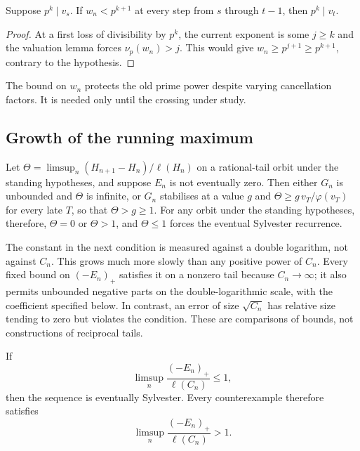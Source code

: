 \begin{corollary}\label{long243:res:powerpersistence}
Suppose $p^k\mid v_s$. If $w_n<p^{k+1}$ at every step from $s$ through
$t-1$, then $p^k\mid v_t$.
\end{corollary}
\begin{proof}
At a first loss of divisibility by $p^k$, the current exponent is some
$j\ge k$ and the valuation lemma forces $\nu_p(w_n)>j$. This would give
$w_n\ge p^{j+1}\ge p^{k+1}$, contrary to the hypothesis.
\end{proof}
The bound on $w_n$ protects the old prime power despite varying
cancellation factors. It is needed only until the crossing under study.

\subsection{Growth of the running maximum}

\begin{theorem}\label{long243:res:recorddichotomy}
Let $\Theta=\limsup_n(H_{n+1}-H_n)/\ell(H_n)$ on a rational-tail orbit
under the standing hypotheses, and suppose $E_n$ is not eventually zero.
Then either $G_n$ is unbounded and $\Theta$ is infinite, or
$G_n$ stabilises at a value $g$ and $\Theta\ge g\,v_T/\varphi(v_T)$ for every
late $T$, so that $\Theta>g\ge1$.  For any orbit under the standing
hypotheses, therefore, $\Theta=0$ or $\Theta>1$, and $\Theta\le1$ forces
the eventual Sylvester recurrence.
\end{theorem}

The constant in the next condition is measured against a double
logarithm, not against $C_n$. This grows much more slowly than any
positive power of $C_n$. Every fixed bound on $(-E_n)_+$ satisfies
it on a nonzero tail because $C_n\to\infty$; it also permits unbounded
negative parts on the double-logarithmic scale, with the coefficient
specified below. In contrast, an error of size
$\sqrt{C_n}$ has relative size tending to zero but violates the condition.
These are comparisons of bounds, not constructions of reciprocal tails.

\begin{corollary}\label{long243:res:loglogboundary}
If
\[
 \limsup_n\frac{(-E_n)_+}{\ell(C_n)}\le1,
\]
then the sequence is eventually Sylvester. Every counterexample therefore
satisfies
\[
 \limsup_n\frac{(-E_n)_+}{\ell(C_n)}>1.
\]
\end{corollary}

